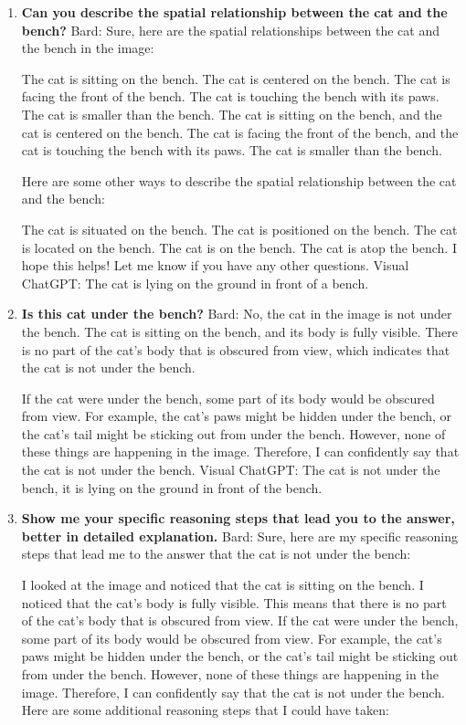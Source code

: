     \begin{enumerate}
        \item \textbf{Can you describe the spatial relationship between the cat and the bench?}
        \subitem Bard:
        Sure, here are the spatial relationships between the cat and the bench in the image:

        The cat is sitting on the bench.
        The cat is centered on the bench.
        The cat is facing the front of the bench.
        The cat is touching the bench with its paws.
        The cat is smaller than the bench.
        The cat is sitting on the bench, and the cat is centered on the bench. The cat is facing the front of the bench, and the cat is touching the bench with its paws. The cat is smaller than the bench.

        Here are some other ways to describe the spatial relationship between the cat and the bench:

        The cat is situated on the bench.
        The cat is positioned on the bench.
        The cat is located on the bench.
        The cat is on the bench.
        The cat is atop the bench.
        I hope this helps! Let me know if you have any other questions.
        \subitem Visual ChatGPT: The cat is lying on the ground in front of a bench.
        \item \textbf{Is this cat under the bench?}
        \subitem Bard: No, the cat in the image is not under the bench. The cat is sitting on the bench, and its body is fully visible. There is no part of the cat's body that is obscured from view, which indicates that the cat is not under the bench.

        If the cat were under the bench, some part of its body would be obscured from view. For example, the cat's paws might be hidden under the bench, or the cat's tail might be sticking out from under the bench. However, none of these things are happening in the image. Therefore, I can confidently say that the cat is not under the bench.
        \subitem Visual ChatGPT: The cat is not under the bench, it is lying on the ground in front of the bench.
        \item \textbf{Show me your specific reasoning steps that lead you to the answer, better in detailed explanation.}
        \subitem Bard: 
        Sure, here are my specific reasoning steps that lead me to the answer that the cat is not under the bench:
        
        I looked at the image and noticed that the cat is sitting on the bench.
        I noticed that the cat's body is fully visible. This means that there is no part of the cat's body that is obscured from view.
        If the cat were under the bench, some part of its body would be obscured from view. For example, the cat's paws might be hidden under the bench, or the cat's tail might be sticking out from under the bench. However, none of these things are happening in the image.
        Therefore, I can confidently say that the cat is not under the bench.
        Here are some additional reasoning steps that I could have taken:
        

\end{enumerate}
